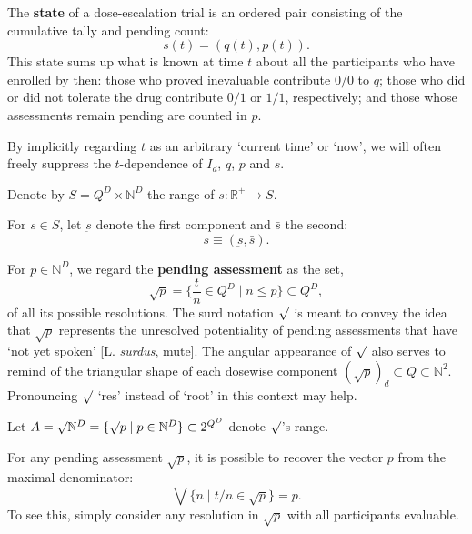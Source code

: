 \documentclass{article}
\newcommand{\N}{\mathbb{N}}
\newcommand{\R}{\mathbb{R}}
\begin{document}
\begin{defn}
  The \textbf{state} of a dose-escalation trial is an ordered pair consisting of the cumulative tally and pending count:
  $$
  s(t) = (q(t), p(t)).
  $$
  This state sums up what is known at time $t$ about all the participants who have enrolled by then: those who proved inevaluable contribute $0/0$ to $q$; those who did or did not tolerate the drug contribute $0/1$ or $1/1$, respectively; and those whose assessments remain pending are counted in $p$.
\end{defn}

\begin{nota}
  By implicitly regarding $t$ as an arbitrary `current time' or `now', we will often freely suppress the $t$-dependence of $I_d$, $q$, $p$ and $s$.
  \end{nota}

\begin{nota}
  Denote by $S = Q^D \times \N^D$ the range of $s : \R^+ \rightarrow S$.
\end{nota}

\begin{nota}
  For $s \in S$, let $\underbar{s}$ denote the first component and $\bar{s}$ the second:
  $$
  s \equiv (\underbar{s},\bar{s}).
  $$
\end{nota}

\begin{defn}\label{delta-p}
  For $p \in \N^D$, we regard the \textbf{pending assessment} as the set,
  $$
  \surd p = \{ \frac{t}{n} \in Q^D \mid n \le p \} \subset Q^D,
  $$
  of all its possible resolutions.
  The surd notation $\surd$ is meant to convey the idea that $\surd p$ represents the unresolved potentiality of pending assessments that have `not yet spoken' [L. {\em surdus}, mute].  The angular appearance of $\surd$ also serves to remind of the triangular shape of each dosewise component $(\surd p)_d \subset Q \subset \N^2$.  Pronouncing $\surd$ `res' instead of `root' in this context may help.
\end{defn}

\begin{nota}
  Let $A = \surd \N^D = \{ \surd p \mid p \in \N^D \} \subset 2^{Q^D}$ denote $\surd$'s range.
\end{nota}

\begin{fact}
  For any pending assessment $\surd p$, it is possible to recover the vector $p$ from the maximal denominator:
  $$
  \bigvee \{ n \mid t/n \in \surd p \} = p.
  $$
  To see this, simply consider any resolution in $\surd p$ with all participants evaluable.
\end{fact}
\end{document}
